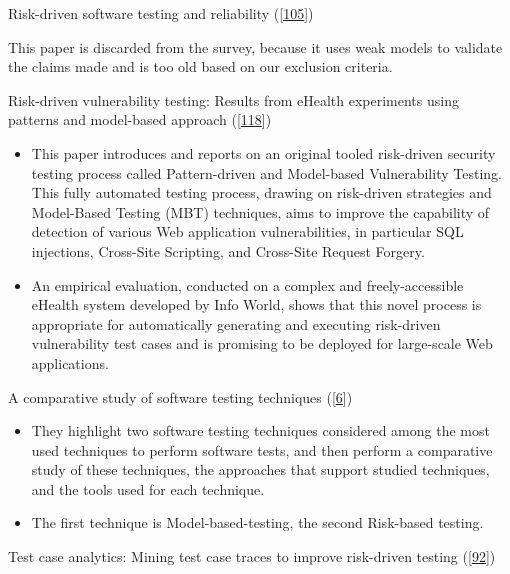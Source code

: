 \documentclass[]{book}
\providecommand{\tightlist}{%
  \setlength{\itemsep}{0pt}\setlength{\parskip}{0pt}}
\begin{document}
Risk-driven software testing and reliability
({[}\protect\hyperlink{ref-schneidewind2007}{105}{]})

This paper is discarded from the survey, because it uses weak models to
validate the claims made and is too old based on our exclusion criteria.

Risk-driven vulnerability testing: Results from eHealth experiments
using patterns and model-based approach
({[}\protect\hyperlink{ref-vernotte2015}{118}{]})

\begin{itemize}
\tightlist
\item
  This paper introduces and reports on an original tooled risk-driven
  security testing process called Pattern-driven and Model-based
  Vulnerability Testing. This fully automated testing process, drawing
  on risk-driven strategies and Model-Based Testing (MBT) techniques,
  aims to improve the capability of detection of various Web application
  vulnerabilities, in particular SQL injections, Cross-Site Scripting,
  and Cross-Site Request Forgery.
\item
  An empirical evaluation, conducted on a complex and freely-accessible
  eHealth system developed by Info World, shows that this novel process
  is appropriate for automatically generating and executing risk-driven
  vulnerability test cases and is promising to be deployed for
  large-scale Web applications.
\end{itemize}

A comparative study of software testing techniques
({[}\protect\hyperlink{ref-atifi2017}{6}{]})

\begin{itemize}
\tightlist
\item
  They highlight two software testing techniques considered among the
  most used techniques to perform software tests, and then perform a
  comparative study of these techniques, the approaches that support
  studied techniques, and the tools used for each technique.
\item
  The first technique is Model-based-testing, the second Risk-based
  testing.
\end{itemize}

Test case analytics: Mining test case traces to improve risk-driven
testing ({[}\protect\hyperlink{ref-noor2015test}{92}{]})
\end{document}
